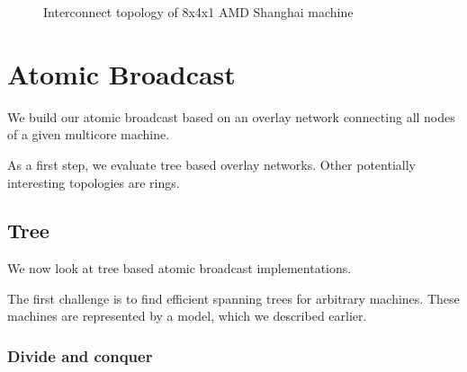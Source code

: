 \documentclass{article}
\begin{document}
\begin{figure}[htb]
  \centering
  \caption{Interconnect topology of 8x4x1 AMD Shanghai machine}
  \label{fig:gruyere}
\end{figure}

\section{Atomic Broadcast}

We build our atomic broadcast based on an overlay network connecting
all nodes of a given multicore machine. 

As a first step, we evaluate tree based overlay networks. Other
potentially interesting topologies are rings.

\subsection{Tree}

We now look at tree based atomic broadcast implementations. 

The first challenge is to find efficient spanning trees for arbitrary
machines. These machines are represented by a model, which we
described earlier.

\subsubsection{Divide and conquer}
\end{document}
